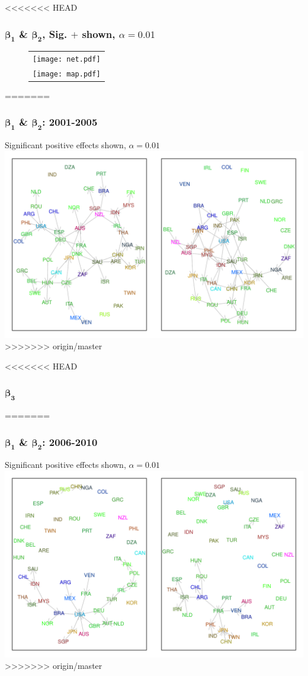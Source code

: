 \documentclass[10pt, compress]{beamer}
\begin{document}
\frame
{
<<<<<<< HEAD
\frametitle{$\boldsymbol{\beta_{1}}$ \& $\boldsymbol{\beta_{2}}$, Sig. $+$ shown, $\alpha = 0.01$}
  \vspace{-15mm}
  \begin{figure}[ht]
  \centering
    \begin{tabular}{c}
      \texttt{[image: net.pdf]} \\
      \texttt{[image: map.pdf]}
    \end{tabular}
  \end{figure}
=======
\frametitle{$\boldsymbol{\beta_{1}}$ \& $\boldsymbol{\beta_{2}}$: 2001-2005}
Significant positive effects shown, $\alpha = 0.01$
  \centering
  \includegraphics[width=1\textwidth]{2001-2005_net.pdf}
>>>>>>> origin/master
}

\frame
{
<<<<<<< HEAD
\frametitle{$\boldsymbol{\beta_{3}}$}
  \centering
  \resizebox{1\textwidth}{!}{}  
=======
\frametitle{$\boldsymbol{\beta_{1}}$ \& $\boldsymbol{\beta_{2}}$: 2006-2010}
Significant positive effects shown, $\alpha = 0.01$
  \centering
  \includegraphics[width=1\textwidth]{2006-2010_net.pdf}
>>>>>>> origin/master
}
\end{document}
